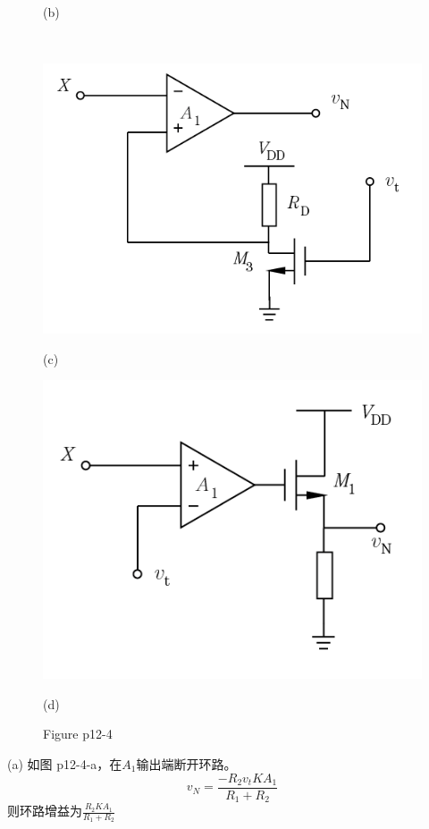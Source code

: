 \documentclass[hyperref, UTF8]{ctexart}
\begin{document}
\begin{figure}[!htb]
\begin{minipage}[t]{0.346\textwidth}
        \caption*{(b)}
        \end{minipage}
        \\
        \begin{minipage}[t]{0.349\textwidth}
        \centering
        \includegraphics[width=1\textwidth]{p12-4-c.png}
        \caption*{(c)}
        \end{minipage}
        \begin{minipage}[t]{0.317\textwidth}
        \centering
        \includegraphics[width=1\textwidth]{p12-4-d.png}
        \caption*{(d)}
        \end{minipage}
        \caption*{Figure p12-4}
    \end{figure}    
    (a) 如图 p12-4-a，在$A_1$输出端断开环路。
    $$v_N = \frac{-R_2v_tKA_1}{R_1+R_2}$$
    则环路增益为$\frac{R_2KA_1}{R_1+R_2}$
\end{document}
